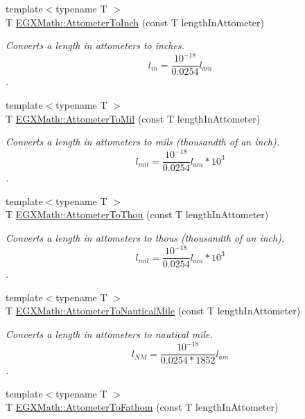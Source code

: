 \begin{DoxyCompactItemize}
{\footnotesize template$<$typename T $>$ }\\T \mbox{\hyperlink{group___e_g_x_math-_conversions-_length_conversions-_s_i-_attometer-_imperial_ga76cb652df52a89284cc3661a670d4990}{E\+G\+X\+Math\+::\+Attometer\+To\+Inch}} (const T length\+In\+Attometer)
\begin{DoxyCompactList}\small\item\em Converts a length in attometers to inches. \[ l_{in}= \frac{10^{-18}}{0.0254} l_{am} \]. \end{DoxyCompactList}\item 
{\footnotesize template$<$typename T $>$ }\\T \mbox{\hyperlink{group___e_g_x_math-_conversions-_length_conversions-_s_i-_attometer-_imperial_ga1ad78989a93e5316f787a6412e2c8e3a}{E\+G\+X\+Math\+::\+Attometer\+To\+Mil}} (const T length\+In\+Attometer)
\begin{DoxyCompactList}\small\item\em Converts a length in attometers to mils (thousandth of an inch). \[ l_{mil}= \frac{10^{-18}}{0.0254} l_{am} * 10^{3} \]. \end{DoxyCompactList}\item 
{\footnotesize template$<$typename T $>$ }\\T \mbox{\hyperlink{group___e_g_x_math-_conversions-_length_conversions-_s_i-_attometer-_imperial_gac9c9742b80b24da4e531fbcdc39976bb}{E\+G\+X\+Math\+::\+Attometer\+To\+Thou}} (const T length\+In\+Attometer)
\begin{DoxyCompactList}\small\item\em Converts a length in attometers to thous (thousandth of an inch). \[ l_{mil}= \frac{10^{-18}}{0.0254} l_{am} * 10^{3} \]. \end{DoxyCompactList}\item 
{\footnotesize template$<$typename T $>$ }\\T \mbox{\hyperlink{group___e_g_x_math-_conversions-_length_conversions-_s_i-_attometer-_nautical_ga38f0b72d347141e8740bcf9d84a08d25}{E\+G\+X\+Math\+::\+Attometer\+To\+Nautical\+Mile}} (const T length\+In\+Attometer)
\begin{DoxyCompactList}\small\item\em Converts a length in attometers to nautical mile. \[ l_{NM}= \frac{10^{-18}}{0.0254 * 1852} l_{am} \]. \end{DoxyCompactList}\item 
{\footnotesize template$<$typename T $>$ }\\T \mbox{\hyperlink{group___e_g_x_math-_conversions-_length_conversions-_s_i-_attometer-_nautical_ga969bc018e3f734e6c4012502d9c6c801}{E\+G\+X\+Math\+::\+Attometer\+To\+Fathom}} (const T length\+In\+Attometer)

\end{DoxyCompactItemize}
